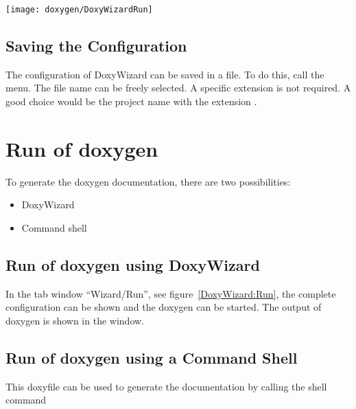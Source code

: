 \begin{center}
	\texttt{[image: doxygen/DoxyWizardRun]}
	\label{DoxyWizard:Run}
\end{center} 



\subsection{Saving the Configuration}

The configuration of DoxyWizard can be saved in a file. To do this, call the menu. The file name can be freely selected. A specific extension is not required. A good choice would be the project name with the extension .








\section{Run of doxygen}

To generate the doxygen documentation, there are two  possibilities:

\begin{itemize}
	\item DoxyWizard
	\item Command shell
\end{itemize}


\subsection{Run of doxygen using DoxyWizard}


In the tab window ``Wizard/Run'', see figure~\ref{DoxyWizard:Run}, the complete configuration can be shown and the doxygen can be started. The output of doxygen is shown in the window.


\subsection{Run of doxygen using a Command Shell}


This doxyfile can be used to generate the documentation by calling the shell command

\medskip


\medskip

